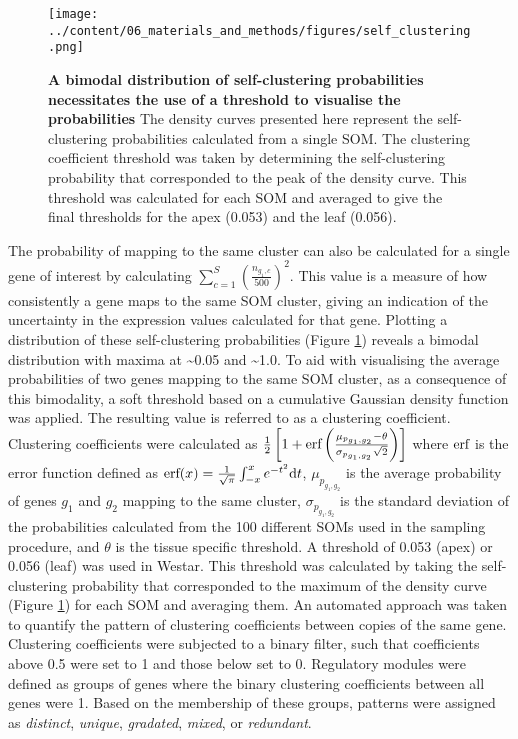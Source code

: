 \documentclass[12pt,]{book}
\begin{document}
\begin{figure}[htbp]
\centering
\texttt{[image: ../content/06\_materials\_and\_methods/figures/self\_clustering.png]}
\caption{\textbf{A bimodal distribution of self-clustering probabilities
necessitates the use of a threshold to visualise the probabilities} The
density curves presented here represent the self-clustering
probabilities calculated from a single SOM. The clustering coefficient
threshold was taken by determining the self-clustering probability that
corresponded to the peak of the density curve. This threshold was
calculated for each SOM and averaged to give the final thresholds for
the apex (0.053) and the leaf (0.056).}\label{figure:methods:bimodal}
\end{figure}

The probability of mapping to the same cluster can also be calculated
for a single gene of interest by calculating
\(\sum_{c=1}^{S}\left (\frac{n_{g_{1}, c}}{500} \right )^2\). This value
is a measure of how consistently a gene maps to the same SOM cluster,
giving an indication of the uncertainty in the expression values
calculated for that gene. Plotting a distribution of these
self-clustering probabilities (Figure \ref{figure:methods:bimodal})
reveals a bimodal distribution with maxima at \textasciitilde{}0.05 and
\textasciitilde{}1.0. To aid with visualising the average probabilities
of two genes mapping to the same SOM cluster, as a consequence of this
bimodality, a soft threshold based on a cumulative Gaussian density
function was applied. The resulting value is referred to as a clustering
coefficient. Clustering coefficients were calculated as
\(\frac{1}{2} \left [1 + \textup{erf} \left ( \frac{\mu_{p_{g_1,g_2}} - \theta}{\sigma_{p_{g_1,g_2}}\sqrt{2}} \right ) \right ]\)
where \(\textup{erf}\) is the error function defined as
\(\textup{erf}(x) = \frac{1}{\sqrt{\pi}}\int_{-x}^{x}e^{-t^2}\textup{d}t\),
\(\mu_{p_{g_1,g_2}}\) is the average probability of genes \(g_1\) and
\(g_2\) mapping to the same cluster, \(\sigma_{p_{g_1,g_2}}\) is the
standard deviation of the probabilities calculated from the 100
different SOMs used in the sampling procedure, and \(\theta\) is the
tissue specific threshold. A threshold of 0.053 (apex) or 0.056 (leaf)
was used in Westar. This threshold was calculated by taking the
self-clustering probability that corresponded to the maximum of the
density curve (Figure \ref{figure:methods:bimodal}) for each SOM and
averaging them. An automated approach was taken to quantify the pattern
of clustering coefficients between copies of the same gene. Clustering
coefficients were subjected to a binary filter, such that coefficients
above 0.5 were set to 1 and those below set to 0. Regulatory modules
were defined as groups of genes where the binary clustering coefficients
between all genes were 1. Based on the membership of these groups,
patterns were assigned as \emph{distinct}, \emph{unique},
\emph{gradated}, \emph{mixed}, or \emph{redundant}.
\end{document}
